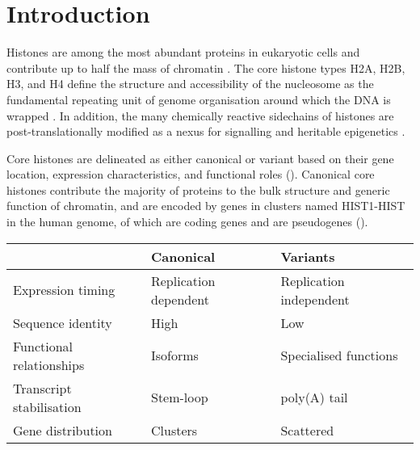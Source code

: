 \section{Introduction}

  Histones are among the most abundant proteins in eukaryotic cells
  and contribute up to half the mass of chromatin \citep{AlbertsMBoC}.
  The core histone types H2A, H2B, H3, and H4
  define the structure and accessibility of the nucleosome
  as the fundamental repeating unit of genome organisation
  around which the DNA is wrapped \citep{Luger1997structure}.
  In addition, the many chemically reactive sidechains of histones
  are post-translationally modified
  as a nexus for signalling and heritable epigenetics \citep{Kouzarides2007}.

  Core histones are delineated as either canonical or variant based on
  their gene location, expression characteristics,
  and functional roles ().
  Canonical core histones contribute the majority of proteins to
  the bulk structure and generic function of chromatin,
  and are encoded by \TotalCoreGenes{} genes in \NumberOfClusters{}
  clusters named HIST1-HIST\NumberOfClusters{} in the human genome,
  of which \TotalCoreCodingGenes{} are coding genes and \TotalCorePseudoGenes{}
  are pseudogenes ().

  \begin{table}
                 {}
    \label{tab:typical-histone-differences}
    \centering
    \begin{tabular}{l l l}
      \toprule
      \null                     & Canonical             & Variants \\
      \midrule
      Expression timing         & Replication dependent & Replication independent \\
      Sequence identity         & High                  & Low \\
      Functional relationships  & Isoforms              & Specialised functions \\
      Transcript stabilisation  & Stem-loop             & poly(A) tail \\
      Gene distribution         & Clusters              & Scattered \\
      \bottomrule
    \end{tabular}
  \end{table}

